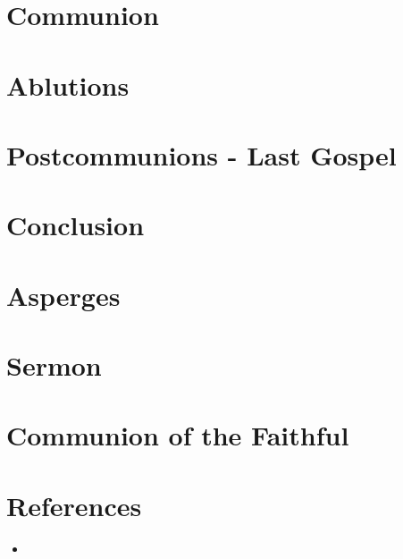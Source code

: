 \documentclass[letterpaper, twocolumn]{article}
\begin{document}
	\section*{Communion}
	\section*{Ablutions}
	\section*{Postcommunions - Last Gospel}
	\section*{Conclusion}
	\section*{Asperges}
	\section*{Sermon}
	\section*{Communion of the Faithful}
	\section*{References}
		\begin{itemize}
			\item 
		\end{itemize}
\end{document}
